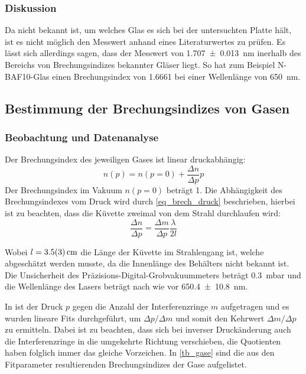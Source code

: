 \documentclass[
	a4paper,
	12pt,
	pagesize,
	ngerman
]{scrartcl}
\begin{document}
	\subsubsection{Diskussion}
	Da nicht bekannt ist, um welches Glas es sich bei der untersuchten Platte hält, ist es nicht möglich den Messwert anhand eines Literaturwertes zu prüfen.
	Es lässt sich allerdings sagen, dass der Messwert von \SI{1.707+-0.013}{nm} inerhalb des Bereichs von Brechungsindizes bekannter Gläser liegt.
	So hat zum Beispiel N-BAF10-Glas einen Brechungsindex von \SI{1,6661}{} bei einer Wellenlänge von \SI{650}{nm}.\cite{Brechungsindizes}

	\subsection{Bestimmung der Brechungsindizes von Gasen}
	\subsubsection{Beobachtung und Datenanalyse}
	Der Brechungsindex des jeweiligen Gases ist linear druckabhängig:
	\begin{equation}
		n(p) = n(p=0) + \frac{\Delta n}{\Delta p}p
		\label{eq_brech_p}
	\end{equation}
	Der Brechungsindex im Vakuum $n(p=0)$ beträgt 1.
	Die Abhängigkeit des Brechungsindexes vom Druck wird durch \cref{eq_brech_druck} beschrieben, hierbei ist zu beachten, dass die Küvette zweimal von dem Strahl durchlaufen wird:
	\begin{equation}
			\frac{\Delta n}{\Delta p} = \frac{\Delta m}{\Delta p} \frac{\lambda}{2l}
	\end{equation}

	Wobei $l=\SI{3.5+-0.3}{cm}$ die Länge der Küvette im Strahlengang ist, welche abgeschätzt werden musste, da die Innenlänge des Behälters nicht bekannt ist.
	Die Unsicherheit des Präzisions-Digital-Grobvakuummeters beträgt \SI{0.3}{mbar} und die Wellenlänge des Lasers beträgt nach wie vor \SI{650.4+-10.8}{nm}.

	In  ist der Druck $p$ gegen die Anzahl der Interferenzringe $m$ aufgetragen und es wurden lineare Fits durchgeführt, um $\Delta p / \Delta m$ und somit den Kehrwert $\Delta m / \Delta p$ zu ermitteln.
	Dabei ist zu beachten, dass sich bei inverser Druckänderung auch die Interferenzringe in die umgekehrte Richtung verschieben, die Quotienten haben folglich immer das gleiche Vorzeichen.
	In \cref{tb_gase} sind die aus den Fitparameter resultierenden Brechungsindizes der Gase aufgelistet.
\end{document}
